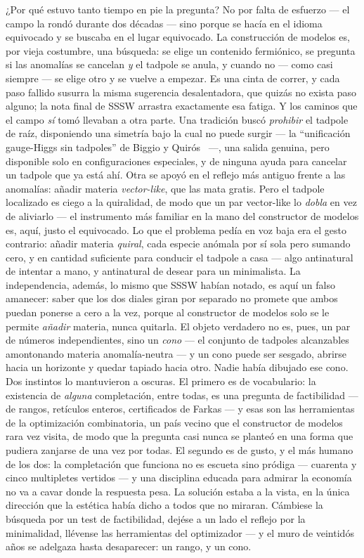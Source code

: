 \documentclass[11pt,a4paper]{article}
\begin{document}
¿Por qu\'e estuvo tanto tiempo en pie la pregunta? No por falta de esfuerzo --- el campo la
rond\'o durante dos d\'ecadas --- sino porque se hac\'ia en el idioma equivocado y se buscaba
en el lugar equivocado. La construcci\'on de modelos es, por vieja costumbre, una b\'usqueda:
se elige un contenido fermi\'onico, se pregunta si las anomal\'ias se cancelan \emph{y} el
tadpole se anula, y cuando no --- como casi siempre --- se elige otro y se vuelve a empezar. Es
una cinta de correr, y cada paso fallido susurra la misma sugerencia desalentadora, que quiz\'as
no exista paso alguno; la nota final de SSSW arrastra exactamente esa fatiga. Y los caminos que
el campo \emph{s\'i} tom\'o llevaban a otra parte. Una tradici\'on busc\'o \emph{prohibir} el
tadpole de ra\'iz, disponiendo una simetr\'ia bajo la cual no puede surgir --- la
``unificaci\'on gauge-Higgs sin tadpoles'' de Biggio y Quir\'os~\cite{BiggioQ} ---, una salida
genuina, pero disponible solo en configuraciones especiales, y de ninguna ayuda para cancelar un
tadpole que ya est\'a ah\'i. Otra se apoy\'o en el reflejo m\'as antiguo frente a las
anomal\'ias: a\~nadir materia \emph{vector-like}, que las mata gratis. Pero el tadpole localizado
es ciego a la quiralidad, de modo que un par vector-like lo \emph{dobla} en vez de aliviarlo ---
el instrumento m\'as familiar en la mano del constructor de modelos es, aqu\'i, justo el
equivocado. Lo que el problema ped\'ia en voz baja era el gesto contrario: a\~nadir materia
\emph{quiral}, cada especie an\'omala por s\'i sola pero sumando cero, y en cantidad suficiente
para conducir el tadpole a casa --- algo antinatural de intentar a mano, y antinatural de desear
para un minimalista. La independencia, adem\'as, lo mismo que SSSW hab\'ian notado, es aqu\'i un
falso amanecer: saber que los dos diales giran
por separado no promete que ambos puedan ponerse a cero a la vez, porque al constructor de
modelos solo se le permite \emph{a\~nadir} materia, nunca quitarla. El objeto verdadero no es,
pues, un par de n\'umeros independientes, sino un \emph{cono} --- el conjunto de tadpoles
alcanzables amontonando materia anomal\'ia-neutra --- y un cono puede ser sesgado, abrirse hacia
un horizonte y quedar tapiado hacia otro. Nadie hab\'ia dibujado ese cono. Dos instintos lo
mantuvieron a oscuras. El primero es de vocabulario: la existencia de \emph{alguna}
completaci\'on, entre todas, es una pregunta de factibilidad --- de rangos, ret\'iculos enteros,
certificados de Farkas --- y esas son las herramientas de la optimizaci\'on combinatoria, un
pa\'is vecino que el constructor de modelos rara vez visita, de modo que la pregunta casi nunca
se plante\'o en una forma que pudiera zanjarse de una vez por todas. El segundo es de gusto, y el
m\'as humano de los dos: la completaci\'on que funciona no es escueta sino pr\'odiga ---
cuarenta y cinco multipletes vertidos --- y una disciplina educada para admirar la econom\'ia no
va a cavar donde la respuesta pesa. La soluci\'on estaba a la vista, en la \'unica direcci\'on
que la est\'etica hab\'ia dicho a todos que no miraran. C\'ambiese la b\'usqueda por un test de
factibilidad, dej\'ese a un lado el reflejo por la minimalidad, ll\'evense las herramientas del
optimizador --- y el muro de veintid\'os a\~nos se adelgaza hasta desaparecer: un rango, y un
cono.
\end{document}
